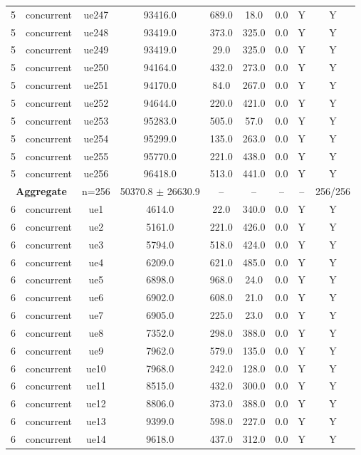 \begin{table}[ht]
\begin{tabular}{|c|c|c|c|c|c|c|c|c|}
5 & concurrent & ue247 & 93416.0 & 689.0 & 18.0 & 0.0 & Y & Y \\
5 & concurrent & ue248 & 93419.0 & 373.0 & 325.0 & 0.0 & Y & Y \\
5 & concurrent & ue249 & 93419.0 & 29.0 & 325.0 & 0.0 & Y & Y \\
5 & concurrent & ue250 & 94164.0 & 432.0 & 273.0 & 0.0 & Y & Y \\
5 & concurrent & ue251 & 94170.0 & 84.0 & 267.0 & 0.0 & Y & Y \\
5 & concurrent & ue252 & 94644.0 & 220.0 & 421.0 & 0.0 & Y & Y \\
5 & concurrent & ue253 & 95283.0 & 505.0 & 57.0 & 0.0 & Y & Y \\
5 & concurrent & ue254 & 95299.0 & 135.0 & 263.0 & 0.0 & Y & Y \\
5 & concurrent & ue255 & 95770.0 & 221.0 & 438.0 & 0.0 & Y & Y \\
5 & concurrent & ue256 & 96418.0 & 513.0 & 441.0 & 0.0 & Y & Y \\
\multicolumn{2}{|c|}{\textbf{Aggregate}} & n=256 & 50370.8 $\pm$ 26630.9 & -- & -- & -- & -- & 256/256 \\
\hline
6 & concurrent & ue1 & 4614.0 & 22.0 & 340.0 & 0.0 & Y & Y \\
6 & concurrent & ue2 & 5161.0 & 221.0 & 426.0 & 0.0 & Y & Y \\
6 & concurrent & ue3 & 5794.0 & 518.0 & 424.0 & 0.0 & Y & Y \\
6 & concurrent & ue4 & 6209.0 & 621.0 & 485.0 & 0.0 & Y & Y \\
6 & concurrent & ue5 & 6898.0 & 968.0 & 24.0 & 0.0 & Y & Y \\
6 & concurrent & ue6 & 6902.0 & 608.0 & 21.0 & 0.0 & Y & Y \\
6 & concurrent & ue7 & 6905.0 & 225.0 & 23.0 & 0.0 & Y & Y \\
6 & concurrent & ue8 & 7352.0 & 298.0 & 388.0 & 0.0 & Y & Y \\
6 & concurrent & ue9 & 7962.0 & 579.0 & 135.0 & 0.0 & Y & Y \\
6 & concurrent & ue10 & 7968.0 & 242.0 & 128.0 & 0.0 & Y & Y \\
6 & concurrent & ue11 & 8515.0 & 432.0 & 300.0 & 0.0 & Y & Y \\
6 & concurrent & ue12 & 8806.0 & 373.0 & 388.0 & 0.0 & Y & Y \\
6 & concurrent & ue13 & 9399.0 & 598.0 & 227.0 & 0.0 & Y & Y \\
6 & concurrent & ue14 & 9618.0 & 437.0 & 312.0 & 0.0 & Y & Y \\

\end{tabular}
\end{table}
